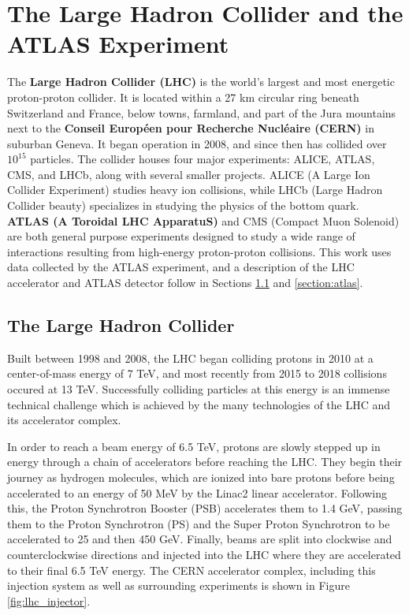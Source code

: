\chapter{The Large Hadron Collider and the ATLAS Experiment}
\label{chapter:lhcatlas}

The \textbf{Large Hadron Collider (LHC)} is the world's largest and most energetic proton-proton collider. It is located within a 27 km circular ring beneath Switzerland and France, below towns, farmland, and part of the Jura mountains next to the \textbf{Conseil Européen pour Recherche Nucléaire (CERN)} in suburban Geneva. It began operation in 2008, and since then has collided over $10^{15}$ particles. The collider houses four major experiments: ALICE, ATLAS, CMS, and LHCb, along with several smaller projects. ALICE (A Large Ion Collider Experiment) studies heavy ion collisions, while LHCb (Large Hadron Collider beauty) specializes in studying the physics of the bottom quark. \textbf{ATLAS (A Toroidal LHC ApparatuS)} and CMS (Compact Muon Solenoid) are both general purpose experiments designed to study a wide range of interactions resulting from high-energy proton-proton collisions. This work uses data collected by the ATLAS experiment, and a description of the LHC accelerator and ATLAS detector follow in Sections \ref{section:lhc} and \ref{section:atlas}.

\section{The Large Hadron Collider}
\label{section:lhc}
Built between 1998 and 2008, the LHC \cite{LHCDesign} began colliding protons in 2010 at a center-of-mass energy of 7 TeV, and most recently from 2015 to 2018 collisions occured at 13 TeV. Successfully colliding particles at this energy is an immense technical challenge which is achieved by the many technologies of the LHC and its accelerator complex.

In order to reach a beam energy of 6.5 TeV, protons are slowly stepped up in energy through a chain of accelerators before reaching the LHC. They begin their journey as hydrogen molecules, which are ionized into bare protons before being accelerated to an energy of 50 MeV by the Linac2 linear accelerator. Following this, the Proton Synchrotron Booster (PSB) accelerates them to 1.4 GeV, passing them to the Proton Synchrotron (PS) and the Super Proton Synchrotron to be accelerated to 25 and then 450 GeV. Finally, beams are split into clockwise and counterclockwise directions and injected into the LHC where they are accelerated to their final 6.5 TeV energy. The CERN accelerator complex, including this injection system as well as surrounding experiments is shown in Figure \ref{fig:lhc_injector}.

